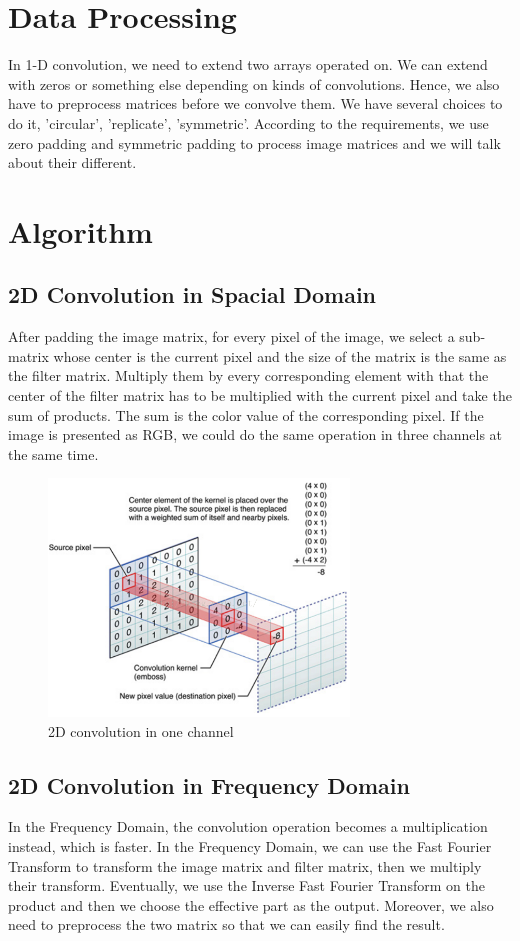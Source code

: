 \section*{Data Processing}
	In 1-D convolution, we need to extend two arrays operated on. We can extend with zeros or something else depending on kinds of convolutions. Hence, we also have to preprocess matrices before we convolve them. We have several choices to do it, 'circular', 'replicate', 'symmetric'. According to the requirements, we use zero padding and symmetric padding to process image matrices and we will talk about their different.

\section{Algorithm}
	\subsection{2D Convolution in Spacial Domain}
	After padding the image matrix, for every pixel of the image, we select a sub-matrix whose center is the current pixel and the size of the matrix is the same as the filter matrix. Multiply them by every corresponding element with that the center of the filter matrix has to be multiplied with the current pixel and take the sum of products. The sum is the color value of the corresponding pixel. If the image is presented as RGB, we could do the same operation in three channels at the same time. 
	\begin{figure}[h]
		\centering
		\includegraphics[width=8cm]{convolution}
		\caption{2D convolution in one channel}
	\end{figure}
	
	\subsection{2D Convolution in Frequency Domain}
	In the Frequency Domain, the convolution operation becomes a multiplication instead, which is faster. In the Frequency Domain, we can use the Fast Fourier Transform to transform the image matrix and filter matrix, then we multiply their transform. Eventually, we use the Inverse Fast Fourier Transform on the product and then we choose the effective part as the output. Moreover, we also need to preprocess the two matrix so that we can easily find the result. 


